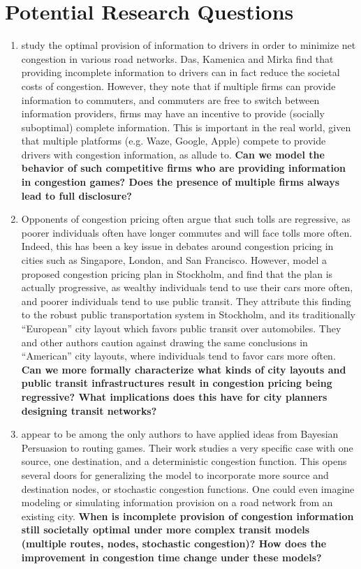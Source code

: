 \documentclass[JEL]{AEA}
\begin{document}
\section{Potential Research Questions}
\label{research-questions}

\begin{enumerate}
\item \cite{das-2017} study the optimal provision of information to drivers in order to minimize net congestion in various road networks. Das, Kamenica and Mirka find that providing incomplete information to drivers can in fact reduce the societal costs of congestion. However, they note that if multiple firms can provide information to commuters, and commuters are free to switch between information providers, firms may have an incentive to provide (socially suboptimal) complete information. This is important in the real world, given that multiple platforms (e.g. Waze, Google, Apple) compete to provide drivers with congestion information, as \cite{ostrovsky-2018} allude to. \textbf{Can we model the behavior of such competitive firms who are providing information in congestion games? Does the presence of multiple firms always lead to full disclosure?}

\item Opponents of congestion pricing often argue that such tolls are regressive, as poorer individuals often have longer commutes and will face tolls more often. Indeed, this has been a key issue in debates around congestion pricing in cities such as Singapore, London, and San Francisco. However, \cite{eliasson-2006} model a proposed congestion pricing plan in Stockholm, and find that the plan is actually progressive, as wealthy individuals tend to use their cars more often, and poorer individuals tend to use public transit. They attribute this finding to the robust public transportation system in Stockholm, and its traditionally ``European” city layout which favors public transit over automobiles. They and other authors caution against drawing the same conclusions in ``American” city layouts, where individuals tend to favor cars more often. \textbf{Can we more formally characterize what kinds of city layouts and public transit infrastructures result in congestion pricing being regressive? What implications does this have for city planners designing transit networks?}

\item \cite{das-2017} appear to be among the only authors to have applied ideas from Bayesian Persuasion to routing games. Their work studies a very specific case with one source, one destination, and a deterministic congestion function. This opens several doors for generalizing the model to incorporate more source and destination nodes, or stochastic congestion functions. One could even imagine modeling or simulating information provision on a road network from an existing city. \textbf{When is incomplete provision of congestion information still societally optimal under more complex transit models (multiple routes, nodes, stochastic congestion)? How does the improvement in congestion time change under these models?}


\end{enumerate}
\end{document}
